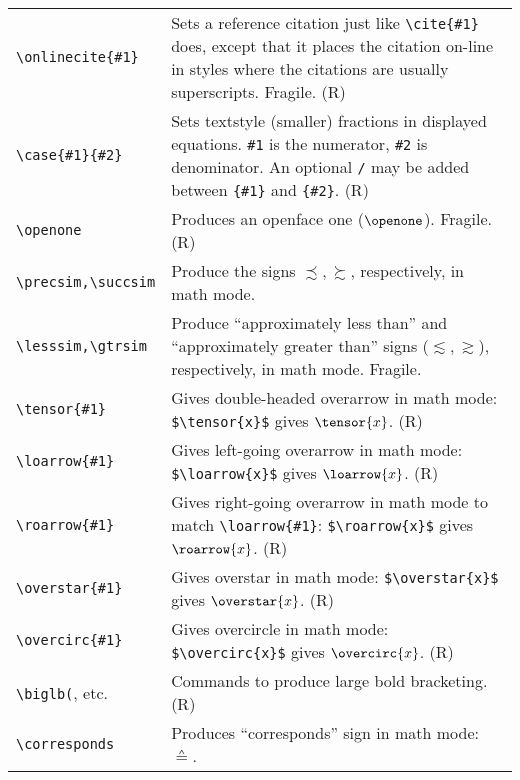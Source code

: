 \begin{quasitable}
\begin{tabular}{lp{4.5in}}
\verb+\onlinecite{#1}+  &
         Sets a reference citation just
           like \verb+\cite{#1}+ does, except that it places the citation
                        on-line in styles where the citations are usually
                        superscripts.  Fragile. (R)
                          \\[4pt]

\verb+\case{#1}{#2}+  &
      Sets textstyle (smaller) fractions in displayed
    equations. \verb+#1+ is the numerator, \verb+#2+ is denominator. An
    optional \verb+/+ may be added between \verb+{#1}+ and \verb+{#2}+. (R)
                     \\[4pt]

\verb+\openone+  &
                Produces an openface one ($\openone$). Fragile. (R) \\[4pt]

\verb+\precsim,\succsim+  &
               Produce the signs $\precsim,\succsim$, respectively,
                        in math mode. \\[4pt]

\verb+\lesssim,\gtrsim+  &
               Produce ``approximately less than'' and ``approximately
               greater than'' signs \hbox{($\lesssim,\gtrsim$)},
               respectively, in math mode. Fragile. \\[4pt]

\verb+\tensor{#1}+ & Gives double-headed overarrow in math mode:
        \verb+$\tensor{x}$+ gives $\tensor{x}$. (R)\\
\verb+\loarrow{#1}+ & Gives left-going overarrow in math mode:
        \verb+$\loarrow{x}$+ gives $\loarrow{x}$. (R)\\
\verb+\roarrow{#1}+ & Gives right-going overarrow in math mode to match
        \verb+\loarrow{#1}+: \verb+$\roarrow{x}$+ gives $\roarrow{x}$. (R)\\
\verb+\overstar{#1}+ & Gives overstar in math mode:
     \verb+$\overstar{x}$+ gives $\overstar{x}$. (R)\\
\verb+\overcirc{#1}+ & Gives overcircle in math mode:
     \verb+$\overcirc{x}$+ gives $\overcirc{x}$. (R)\\[4pt]

\verb+\biglb(+, etc.& Commands to produce large bold bracketing. (R)\\[4pt]

\verb+\corresponds+ & Produces ``corresponds'' sign in math mode:
  $\corresponds$.                       \\[4pt]


\end{tabular}
\end{quasitable}
